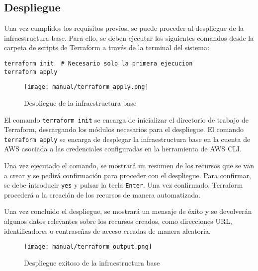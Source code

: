\newpage{}
\subsection{Despliegue}
Una vez cumplidos los requisitos previos, se puede proceder al despliegue de
la infraestructura base. Para ello, se deben ejecutar los siguientes comandos
desde la carpeta de scripts de Terraform a través de la terminal del sistema:

\begin{lstlisting}
terraform init  # Necesario solo la primera ejecucion
terraform apply
\end{lstlisting}

\begin{figure}[H]
	\centering
	\texttt{[image: manual/terraform\_apply.png]}
	\caption{Despliegue de la infraestructura base}
	\label{fig:terraform_apply}
\end{figure}

El comando \texttt{terraform init} se encarga de inicializar el directorio de
trabajo de Terraform, descargando los módulos necesarios para el despliegue.
El comando \texttt{terraform apply} se encarga de desplegar la infraestructura
base en la cuenta de AWS asociada a las credenciales configuradas en la
herramienta de AWS CLI.

Una vez ejecutado el comando, se mostrará un resumen de los recursos que se
van a crear y se pedirá confirmación para proceder con el despliegue. Para
confirmar, se debe introducir \texttt{yes} y pulsar la tecla \texttt{Enter}.
Una vez confirmado, Terraform procederá a la creación de los recursos de manera
automatizada.

Una vez concluido el despliegue, se mostrará un mensaje de éxito y se devolverán
algunos datos relevantes sobre los recursos creados, como direcciones URL,
identificadores o contraseñas de acceso creadas de manera aleatoria.

\begin{figure}[H]
	\centering
	\texttt{[image: manual/terraform\_output.png]}
	\caption{Despliegue exitoso de la infraestructura base}
	\label{fig:terraform_output}
\end{figure}
